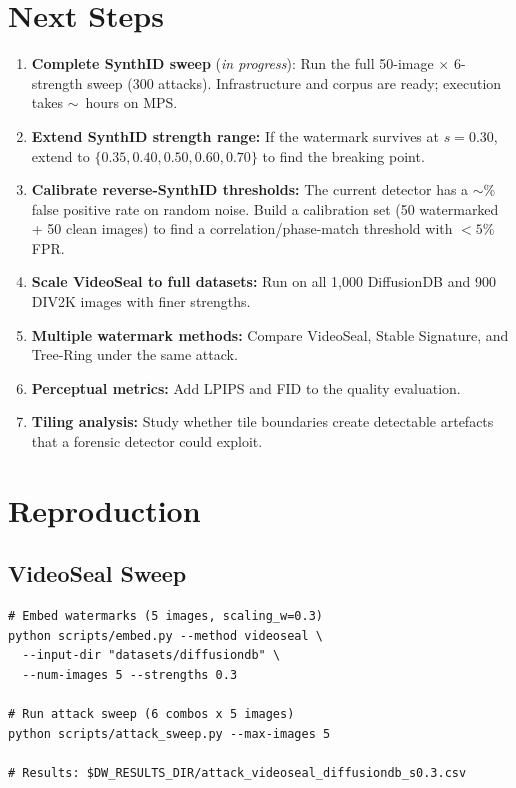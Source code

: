 \documentclass[11pt,a4paper]{article}
\begin{document}
\section{Next Steps}
\label{sec:next}

\begin{enumerate}
    \item \textbf{Complete SynthID sweep} (\textit{in progress}): Run the
    full 50-image $\times$ 6-strength sweep (300 attacks). Infrastructure
    and corpus are ready; execution takes $\sim$~hours on MPS.
    \item \textbf{Extend SynthID strength range:} If the watermark
    survives at $s = 0.30$, extend to
    $\{0.35, 0.40, 0.50, 0.60, 0.70\}$ to find the breaking point.
    \item \textbf{Calibrate reverse-SynthID thresholds:} The current
    detector has a $\sim$\% false positive rate on random noise. Build
    a calibration set (50 watermarked + 50 clean images) to find a
    correlation/phase-match threshold with $< 5\%$ FPR.
    \item \textbf{Scale VideoSeal to full datasets:} Run on all 1{,}000
    DiffusionDB and 900 DIV2K images with finer strengths.
    \item \textbf{Multiple watermark methods:} Compare VideoSeal, Stable
    Signature, and Tree-Ring under the same attack.
    \item \textbf{Perceptual metrics:} Add LPIPS and FID to the quality
    evaluation.
    \item \textbf{Tiling analysis:} Study whether tile boundaries create
    detectable artefacts that a forensic detector could exploit.
\end{enumerate}

\section{Reproduction}
\label{sec:reproduction}

\subsection{VideoSeal Sweep}

\begin{verbatim}
# Embed watermarks (5 images, scaling_w=0.3)
python scripts/embed.py --method videoseal \
  --input-dir "datasets/diffusiondb" \
  --num-images 5 --strengths 0.3

# Run attack sweep (6 combos x 5 images)
python scripts/attack_sweep.py --max-images 5

# Results: $DW_RESULTS_DIR/attack_videoseal_diffusiondb_s0.3.csv
\end{verbatim}
\end{document}
